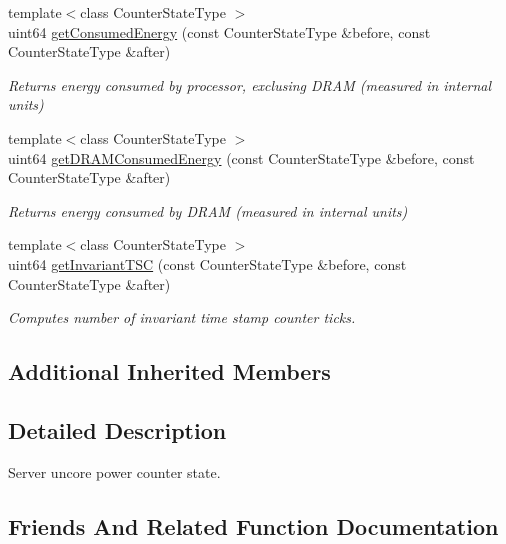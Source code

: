 \begin{DoxyCompactItemize}
{\footnotesize template$<$class Counter\+State\+Type $>$ }\\uint64 \mbox{\hyperlink{class_server_uncore_power_state_a054b949f09283093e1923affa4e58ae8}{get\+Consumed\+Energy}} (const Counter\+State\+Type \&before, const Counter\+State\+Type \&after)
\begin{DoxyCompactList}\small\item\em Returns energy consumed by processor, exclusing D\+R\+AM (measured in internal units) \end{DoxyCompactList}\item 
{\footnotesize template$<$class Counter\+State\+Type $>$ }\\uint64 \mbox{\hyperlink{class_server_uncore_power_state_a71af0766460ef7dd3d138ec0d0924eda}{get\+D\+R\+A\+M\+Consumed\+Energy}} (const Counter\+State\+Type \&before, const Counter\+State\+Type \&after)
\begin{DoxyCompactList}\small\item\em Returns energy consumed by D\+R\+AM (measured in internal units) \end{DoxyCompactList}\item 
{\footnotesize template$<$class Counter\+State\+Type $>$ }\\uint64 \mbox{\hyperlink{class_server_uncore_power_state_a45cf07a8d3ce2c48968842554a3854f9}{get\+Invariant\+T\+SC}} (const Counter\+State\+Type \&before, const Counter\+State\+Type \&after)
\begin{DoxyCompactList}\small\item\em Computes number of invariant time stamp counter ticks. \end{DoxyCompactList}\end{DoxyCompactItemize}
\subsection*{Additional Inherited Members}


\subsection{Detailed Description}
Server uncore power counter state. 

\subsection{Friends And Related Function Documentation}
\mbox{\label{class_server_uncore_power_state_a054b949f09283093e1923affa4e58ae8}} 
